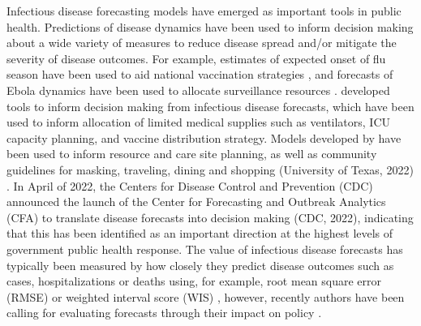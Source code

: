 \documentclass{article}
\begin{document}


Infectious disease forecasting models have emerged as important tools in public health. Predictions of disease dynamics have been used to inform decision making about a wide variety of measures to reduce disease spread and/or mitigate the severity of disease outcomes. For example, estimates of expected onset of flu season have been used to aid national vaccination strategies \citep{igboh2023timing}, and forecasts of Ebola dynamics have been used to allocate surveillance resources \citep{meltzer2014estimating, rainisch2015regional}. \cite{bertsimas2021predictionsCOVID} developed tools to inform decision making from infectious disease forecasts, which have been used to inform allocation of limited medical supplies such as ventilators, ICU capacity planning, and vaccine distribution strategy. Models developed by \cite{fox_real-time_2022} have been used to inform resource and care site planning, as well as community guidelines for masking, traveling, dining and shopping (University of Texas, 2022) \nocite{utnews2022}. In April of 2022, the Centers for Disease Control and Prevention (CDC) announced the launch of the Center for Forecasting and Outbreak Analytics (CFA) to translate disease forecasts into decision making (CDC, 2022)\nocite{cdc2022cfa}, indicating that this has been identified as an important direction at the highest levels of government public health response. The value of infectious disease forecasts has typically been measured by how closely they predict disease outcomes such as cases, hospitalizations or deaths using, for example, root mean square error (RMSE) \citep{papastefanopoulos2020covid} or weighted interval score (WIS) \citep{bracher2021evaluating}, however, recently authors have been calling for evaluating forecasts through their impact on policy \citep{marshall2023predictions}.
\end{document}
